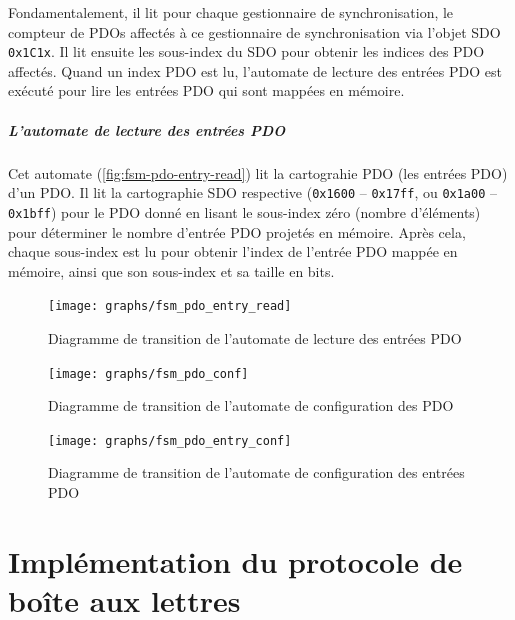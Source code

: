 \documentclass[a4paper,12pt,BCOR=6mm,bibtotoc,idxtotoc]{scrbook}
\begin{document}
Fondamentalement, il lit pour chaque gestionnaire de synchronisation,
le compteur de PDOs affect\'es \`a ce gestionnaire de synchronisation
via l'objet SDO \lstinline+0x1C1x+.  Il lit ensuite les sous-index
du SDO pour obtenir les indices des PDO affect\'es.  Quand un index
PDO est lu, l'automate de lecture des entr\'ees PDO est ex\'ecut\'e
pour lire les entr\'ees PDO qui sont mapp\'ees en m\'emoire.


\paragraph{L'automate de lecture des entr\'ees PDO}
Cet automate (\autoref{fig:fsm-pdo-entry-read}) lit la cartograhie PDO
(les entr\'ees PDO) d'un PDO.  Il lit la cartographie SDO respective
(\lstinline+0x1600+ -- \lstinline+0x17ff+, ou \lstinline+0x1a00+ --
\lstinline+0x1bff+) pour le PDO donn\'e en lisant le sous-index z\'ero
(nombre d'\'el\'ements) pour d\'eterminer le nombre d'entr\'ee PDO
projet\'es en m\'emoire. Apr\`es cela, chaque sous-index est lu
pour obtenir l'index de l'entr\'ee PDO mapp\'ee en m\'emoire, ainsi
que son sous-index et sa taille en bits.

\begin{figure}[htbp]
  \centering
  \texttt{[image: graphs/fsm\_pdo\_entry\_read]}
  \caption{Diagramme de transition de l'automate de lecture des entr\'ees PDO}
  \label{fig:fsm-pdo-entry-read}
\end{figure}

\begin{figure}[htbp]
  \centering
  \texttt{[image: graphs/fsm\_pdo\_conf]}
  \caption{Diagramme de transition de l'automate de configuration des PDO}
  \label{fig:fsm-pdo-conf}
\end{figure}

\begin{figure}[htbp]
  \centering
  \texttt{[image: graphs/fsm\_pdo\_entry\_conf]}
  \caption{Diagramme de transition de l'automate de configuration
    des entr\'ees PDO}
  \label{fig:fsm-pdo-entry-conf}
\end{figure}


\chapter{Impl\'ementation du protocole de bo\^ite aux lettres}

\end{document}
